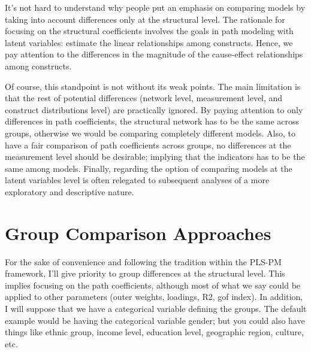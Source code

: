 \documentclass[12pt]{book}\usepackage{graphicx, color}
\begin{document}
It's not hard to understand why people put an emphasis on comparing models by taking into account differences only at the structural level. The rationale for focusing on the structural coefficients involves the goals in path modeling with latent variables: estimate the linear relationships among constructs. Hence, we pay attention to the differences in the magnitude of the cause-effect relationships among constructs.

Of course, this standpoint is not without its weak points. The main limitation is that the rest of potential differences (network level, measurement level, and construct distributions level) are practically ignored. By paying attention to only differences in path coefficients, the structural network has to be the same across groups, otherwise we would be comparing completely different models. Also, to have a fair comparison of path coefficients across groups, no differences at the measurement level should be desirable; implying that the indicators has to be the same among models. Finally, regarding the option of comparing models at the latent variables level is often relegated to subsequent analyses of a more exploratory and descriptive nature.



\section{Group Comparison Approaches}
For the sake of convenience and following the tradition within the PLS-PM framework, I'll give priority to group differences at the structural level. This implies focusing on the path coefficients, although most of what we say could be applied to other parameters (outer weights, loadings, R2, gof index). In addition, I will suppose that we have a categorical variable defining the groups. The default example would be having the categorical variable gender; but you could also have things like ethnic group, income level, education level, geographic region, culture, etc.
\end{document}
